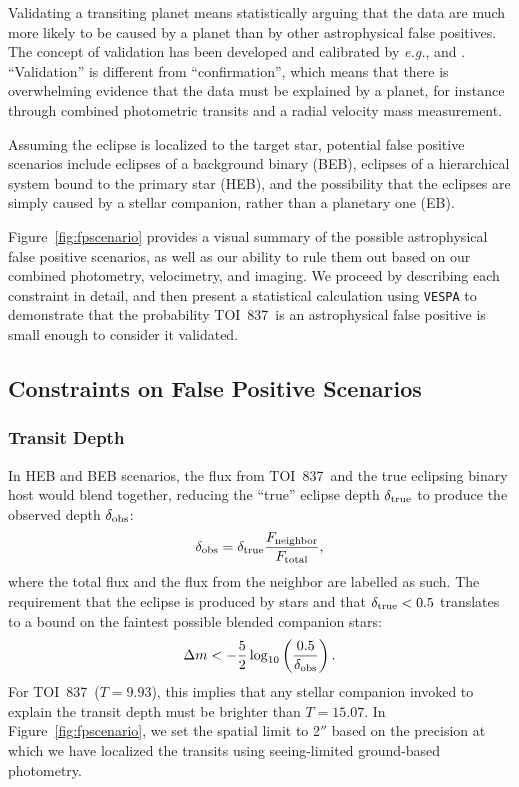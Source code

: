 \documentclass[12pt,twocolumn,tighten]{aastex63}
\newcommand{\tn}{TOI~837} %
\begin{document}
Validating a transiting planet means statistically arguing that
the data are much more likely to be caused by a planet than by other
astrophysical false positives. The concept of validation has been
developed and calibrated by {\it e.g.},
\citet{torres_modeling_2011,morton_efficient_2012,diaz_pastis_2014,santerne_pastis_2015,morton_false_2016}
and \citet{giacalone_triceratops_2020}.  ``Validation'' is different
from ``confirmation'', which means that there is overwhelming evidence
that the data must be explained by a planet, for instance through
combined photometric transits and a radial velocity mass measurement.

Assuming the eclipse is localized to the target star, potential false positive scenarios
include eclipses of a background binary (BEB), eclipses of a
hierarchical system bound to the primary star (HEB), and the possibility
that the eclipses are simply caused by a stellar companion,
rather than a planetary one (EB).

Figure~\ref{fig:fpscenario} provides a visual summary of the possible
astrophysical false positive scenarios, as well as our ability to rule
them out based on our combined photometry, velocimetry, and imaging.
We proceed by describing each constraint in detail, and then present a
statistical calculation using \texttt{VESPA}
\citep{morton_efficient_2012} to demonstrate that the probability \tn\
is an astrophysical false positive is small enough to consider it
validated.



\subsection{Constraints on False Positive Scenarios}
\label{subsec:fp_constraints}

\subsubsection{Transit Depth}
In HEB and BEB scenarios, the flux from \tn\ and the true eclipsing
binary host would blend together, reducing the ``true'' eclipse depth
$\delta_{\rm true}$ to produce the observed depth
$\delta_{\rm obs}$:
\begin{equation}
  \delta_{\rm obs}
  = 
  \delta_{\rm true} \frac{F_{\rm neighbor}}{F_{\rm total}},
\end{equation}
where the total flux and the flux from the neighbor are labelled as
such.  The requirement that the eclipse is produced by stars and that
$\delta_{\rm true} < 0.5$ translates to a bound on the faintest
possible blended companion stars:
\begin{equation}
  \Delta m < -\frac{5}{2} \log_{10} \left( \frac{0.5}{\delta_{\rm obs}} \right).
\end{equation}
For \tn\ ($T=9.93$), this implies that any stellar companion invoked
to explain the transit depth must be brighter than $T=15.07$.  In
Figure~\ref{fig:fpscenario}, we set the spatial limit to 2$''$ based
on the precision at which we have localized the transits using
seeing-limited ground-based photometry.
\end{document}
